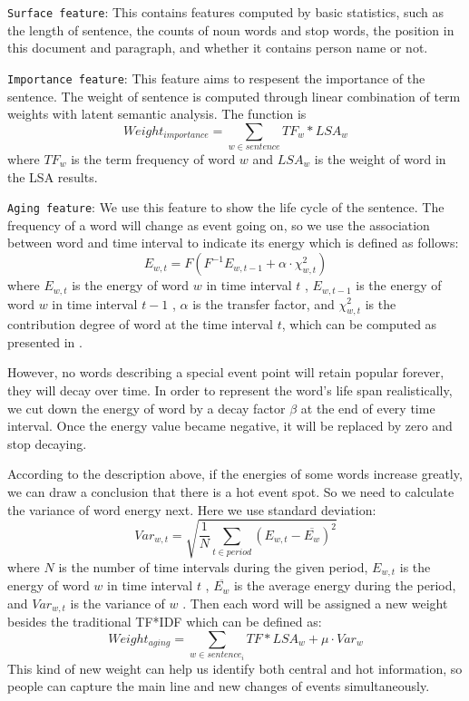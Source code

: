 \documentclass[print]{jicspack}
\begin{document}
\texttt{Surface feature}: This contains features computed by basic statistics, such as the length of sentence, the counts of noun words and stop words, the position in this document and paragraph, and whether it contains person name or not. %

\texttt{Importance feature}: This feature aims to respesent the importance of the sentence. The weight of sentence is computed through linear combination of term weights with latent semantic analysis. The function is 
\begin{equation}
Weight_{importance} = \sum_{w \in sentence}TF_w * LSA_w
\end{equation}
where $TF_w$ is the term frequency of word $w$ and $LSA_w$ is the weight of word in the LSA results.

\texttt{Aging feature}: We use this feature to show the life cycle of the sentence. The frequency of a word will change as event going on, so we use the association between word  and time interval  to indicate its energy which is defined as follows:
\begin{equation}
  E_{w,t} =F(F^{-1}E_{w,t-1}+\alpha\cdot\chi^2_{w,t})
\end{equation}
where $E_{w,t}$ is the energy of word $w$  in time interval $t$ , $E_{w,t-1}$  is the energy of word $w$ in time interval $t-1$ , $\alpha$ is the transfer factor, and $\chi^2_{w,t}$  is the contribution degree of word  at the time interval $t$, which can be computed as presented in \cite{2000-Swan-p49-56}. 

However, no words describing a special event point will retain popular forever, they will decay over time. In order to represent the word's life span realistically, we cut down the energy of word by a decay factor $\beta$ at the end of every time interval.
Once the energy value became negative, it will be replaced by zero and stop decaying.


According to the description above, if the energies of some words increase greatly, we can draw a conclusion that there is a hot event spot. So we need to calculate the variance of word energy next. Here we use standard deviation:
\begin{equation}
Var_{w,t} = \sqrt{ \frac{1}{N} \sum_{t \in period}(E_{w,t}- \overline{E_{w}})^2}
\end{equation}
where $N$ is the number of time intervals during the given period, $E_{w,t}$  is the energy of word $w$  in time interval $t$ , $\overline{E_{w}}$  is the average energy during the period, and $Var_{w,t}$  is the variance of $w$ .
Then each word will be assigned a new weight besides the traditional TF*IDF which can be defined as:
 \begin{equation}
Weight_{aging}=\sum_{w \in sentence_i}TF*LSA_{w} + \mu \cdot Var_{w}
\end{equation}
This kind of new weight can help us identify both central and hot information, so people can capture the main line and new changes of events simultaneously.
\end{document}

